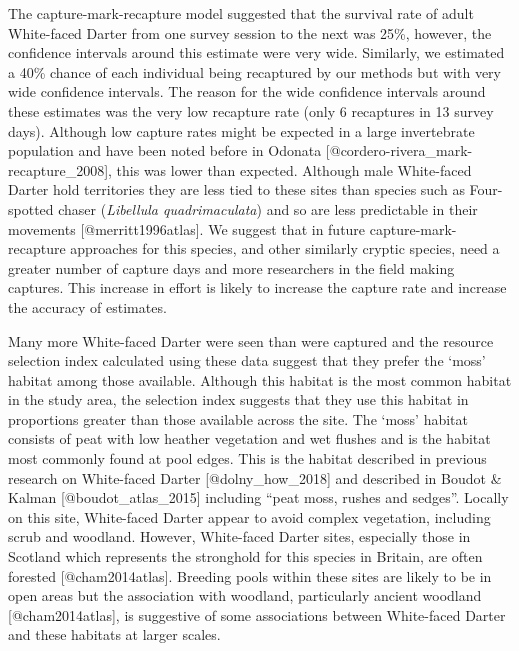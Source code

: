 \documentclass[]{article}
\begin{document}
The capture-mark-recapture model suggested that the survival rate of
adult White-faced Darter from one survey session to the next was 25\%,
however, the confidence intervals around this estimate were very wide.
Similarly, we estimated a 40\% chance of each individual being
recaptured by our methods but with very wide confidence intervals. The
reason for the wide confidence intervals around these estimates was the
very low recapture rate (only 6 recaptures in 13 survey days). Although
low capture rates might be expected in a large invertebrate population
and have been noted before in Odonata
{[}@cordero-rivera\_mark-recapture\_2008{]}, this was lower than
expected. Although male White-faced Darter hold territories they are
less tied to these sites than species such as Four-spotted chaser
(\emph{Libellula quadrimaculata}) and so are less predictable in their
movements {[}@merritt1996atlas{]}. We suggest that in future
capture-mark-recapture approaches for this species, and other similarly
cryptic species, need a greater number of capture days and more
researchers in the field making captures. This increase in effort is
likely to increase the capture rate and increase the accuracy of
estimates.

Many more White-faced Darter were seen than were captured and the
resource selection index calculated using these data suggest that they
prefer the `moss' habitat among those available. Although this habitat
is the most common habitat in the study area, the selection index
suggests that they use this habitat in proportions greater than those
available across the site. The `moss' habitat consists of peat with low
heather vegetation and wet flushes and is the habitat most commonly
found at pool edges. This is the habitat described in previous research
on White-faced Darter {[}@dolny\_how\_2018{]} and described in Boudot \&
Kalman {[}@boudot\_atlas\_2015{]} including ``peat moss, rushes and
sedges''. Locally on this site, White-faced Darter appear to avoid
complex vegetation, including scrub and woodland. However, White-faced
Darter sites, especially those in Scotland which represents the
stronghold for this species in Britain, are often forested
{[}@cham2014atlas{]}. Breeding pools within these sites are likely to be
in open areas but the association with woodland, particularly ancient
woodland {[}@cham2014atlas{]}, is suggestive of some associations
between White-faced Darter and these habitats at larger scales.
\end{document}
